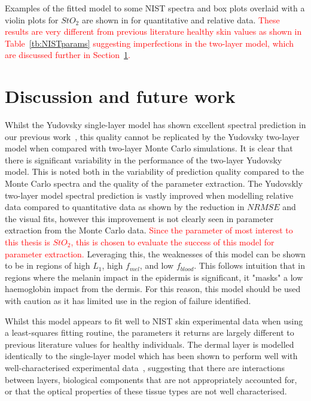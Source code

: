 Examples of the fitted model to some NIST spectra and box plots overlaid with a violin plots for $StO_2$ are shown in  for quantitative and relative data. \textcolor{red}{These results are very different from previous literature healthy skin values as shown in Table~\ref{tb:NISTparams} suggesting imperfections in the two-layer model, which are discussed further in Section~\ref{sec:discussion2}.}
\FloatBarrier

\section{Discussion and future work}\label{sec:discussion2}
Whilst the Yudovsky single-layer model has shown excellent spectral prediction in our previous work~\citep{Bahl2023a}, this quality cannot be replicated by the Yudovsky two-layer model when compared with two-layer Monte Carlo simulations. It is clear that there is significant variability in the performance of the two-layer Yudovsky model. This is noted both in the variability of prediction quality compared to the Monte Carlo spectra and the quality of the parameter extraction. The Yudovskly two-layer model spectral prediction is vastly improved when modelling relative data compared to quantitative data as shown by the reduction in $NRMSE$ and the visual fits, however this improvement is not clearly seen in parameter extraction from the Monte Carlo data. \textcolor{red}{Since the parameter of most interest to this thesis is $StO_2$, this is chosen to evaluate the success of this model for parameter extraction.} Leveraging this, the weaknesses of this model can be shown to be in regions of high $L_1$, high $f_{mel}$, and low $f_{blood}$. This follows intuition that in regions where the melanin impact in the epidermis is significant, it "masks" a low haemoglobin impact from the dermis. For this reason, this model should be used with caution as it has limited use in the region of failure identified.

Whilst this model appears to fit well to NIST skin experimental data when using a least-squares fitting routine, the parameters it returns are largely different to previous literature values for healthy individuals. The dermal layer is modelled identically to the single-layer model which has been shown to perform well with well-characterised experimental data~\citep{Bahl2023a}, suggesting that there are interactions between layers, biological components that are not appropriately accounted for, or that the optical properties of these tissue types are not well characterised.  

